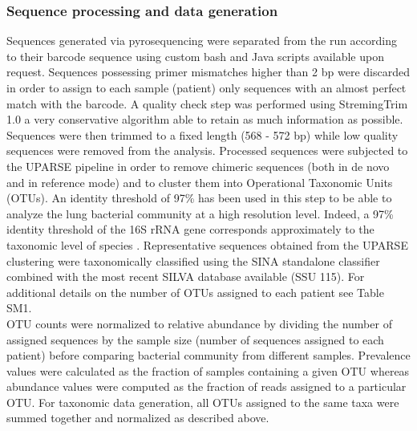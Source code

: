 \subsubsection{Sequence processing and data generation}
Sequences generated via pyrosequencing were separated from the run according to their barcode sequence using custom bash and Java scripts available upon request. Sequences possessing primer mismatches higher than 2 bp were discarded in order to assign to each sample (patient) only sequences with an almost perfect match with the barcode. A quality check step was performed using StremingTrim 1.0 \cite{bacci2014streamingtrim} a very conservative algorithm able to retain as much information as possible. Sequences were then trimmed to a fixed length (568 - 572 bp) while low quality sequences were removed from the analysis. Processed sequences were subjected to the UPARSE pipeline \cite{edgar2013uparse} in order to remove chimeric sequences (both in de novo and in reference mode) and to cluster them into Operational Taxonomic Units (OTUs). An identity threshold of 97\% has been used in this step to be able to analyze the lung bacterial community at a high resolution level. Indeed, a 97\% identity threshold of the 16S rRNA gene corresponds approximately to the taxonomic level of species \cite{konstantinidis2007prokaryotic}. Representative sequences obtained from the UPARSE clustering were taxonomically classified using the SINA standalone classifier combined with the most recent SILVA database available (SSU 115). For additional details on the number of OTUs assigned to each patient see Table SM1.\\
OTU counts were normalized to relative abundance by dividing the number of assigned sequences by the sample size (number of sequences assigned to each patient) before comparing bacterial community from different samples. Prevalence values were calculated as the fraction of samples containing a given OTU whereas abundance values were computed as the fraction of reads assigned to a particular OTU. For taxonomic data generation, all OTUs assigned to the same taxa were summed together and normalized as described above.\\

